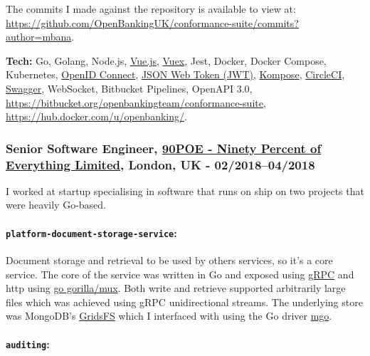 \documentclass[
  a4paper,
]{article}
\begin{document}
The commits I made against the repository is available to view at:
\url{https://github.com/OpenBankingUK/conformance-suite/commits?author=mbana}.

\textbf{Tech:} Go, Golang, Node.js, \href{https://vuejs.org/}{Vue.js},
\href{https://vuex.vuejs.org/}{Vuex}, Jest, Docker, Docker Compose,
Kubernetes, \href{https://openid.net/connect/}{OpenID Connect},
\href{https://jwt.io/}{JSON Web Token (JWT)},
\href{http://kompose.io/}{Kompose},
\href{https://circleci.com/}{CircleCI},
\href{https://swagger.io/}{Swagger}, WebSocket, Bitbucket Pipelines,
OpenAPI 3.0,
\url{https://bitbucket.org/openbankingteam/conformance-suite},
\url{https://hub.docker.com/u/openbanking/}.

\hypertarget{senior-software-engineer-90poe---ninety-percent-of-everything-limited-london-uk---022018042018}{%
\subsubsection{\texorpdfstring{Senior Software Engineer,
\href{https://www.90poe.io/}{90POE - Ninety Percent of Everything
Limited}, London, UK -
02/2018--04/2018}{Senior Software Engineer, 90POE - Ninety Percent of Everything Limited, London, UK - 02/2018--04/2018}}\label{senior-software-engineer-90poe---ninety-percent-of-everything-limited-london-uk---022018042018}}

I worked at startup specialising in software that runs on ship on two
projects that were heavily Go-based.

\hypertarget{platform-document-storage-service}{%
\paragraph{\texorpdfstring{\textbf{\texttt{platform-document-storage-service}}:}{platform-document-storage-service:}}\label{platform-document-storage-service}}

Document storage and retrieval to be used by others services, so it's a
core service. The core of the service was written in Go and exposed
using \href{https://grpc.io/}{gRPC} and http using
\href{https://github.com/gorilla/mux}{go gorilla/mux}. Both write and
retrieve supported arbitrarily large files which was achieved using gRPC
unidirectional streams. The underlying store was MongoDB's
\href{https://docs.mongodb.com/manual/core/gridfs/}{GridsFS} which I
interfaced with using the Go driver \href{https://gopkg.in/mgo.v2}{mgo}.

\hypertarget{auditing}{%
\paragraph{\texorpdfstring{\textbf{\texttt{auditing}}:}{auditing:}}\label{auditing}}
\end{document}
